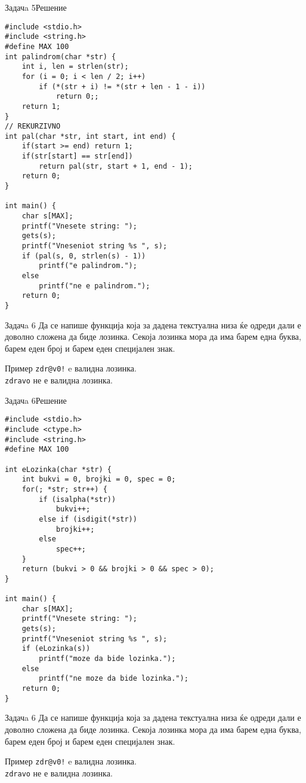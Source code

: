 \begin{frame}[fragile]{Задачa 5}{Решение}
\begin{lstlisting}
#include <stdio.h>
#include <string.h>
#define MAX 100
int palindrom(char *str) {
    int i, len = strlen(str);
    for (i = 0; i < len / 2; i++)
        if (*(str + i) != *(str + len - 1 - i))
            return 0;;
    return 1;
}
// REKURZIVNO
int pal(char *str, int start, int end) {
    if(start >= end) return 1;
    if(str[start] == str[end])
        return pal(str, start + 1, end - 1);
    return 0;
}

int main() {
    char s[MAX];
    printf("Vnesete string: ");
    gets(s);
    printf("Vneseniot string %s ", s);
    if (pal(s, 0, strlen(s) - 1))
        printf("e palindrom.");
    else
        printf("ne e palindrom.");
    return 0;
}
\end{lstlisting}
\end{frame}

\begin{frame}{Задачa 6}
Да се напише функција која за дадена текстуална низа ќе одреди дали е  доволно
сложена да биде лозинка. Секоја лозинка мора да има барем една буква, барем еден
број и барем еден специјален знак.
\begin{exampleblock}{Пример}
\texttt{zdr@v0!} e валидна лозинка.\\
\texttt{zdravo} не е валидна лозинка.
\end{exampleblock}
\end{frame}

\begin{frame}[fragile]{Задачa 6}{Решение}
\begin{lstlisting}
#include <stdio.h>
#include <ctype.h>
#include <string.h>
#define MAX 100

int eLozinka(char *str) {
    int bukvi = 0, brojki = 0, spec = 0;
    for(; *str; str++) {
        if (isalpha(*str))
            bukvi++;
        else if (isdigit(*str))
            brojki++;
        else
            spec++;
    }
    return (bukvi > 0 && brojki > 0 && spec > 0);
}

int main() {
    char s[MAX];
    printf("Vnesete string: ");
    gets(s);
    printf("Vneseniot string %s ", s);
    if (eLozinka(s))
        printf("moze da bide lozinka.");
    else
        printf("ne moze da bide lozinka.");
    return 0;
}
\end{lstlisting}
\end{frame}

\begin{frame}{Задачa 6}
Да се напише функција која за дадена текстуална низа ќе одреди дали е  доволно
сложена да биде лозинка. Секоја лозинка мора да има барем една буква, барем еден
број и барем еден специјален знак.
\begin{exampleblock}{Пример}
\texttt{zdr@v0!} e валидна лозинка.\\
\texttt{zdravo} не е валидна лозинка.
\end{exampleblock}
\end{frame}

